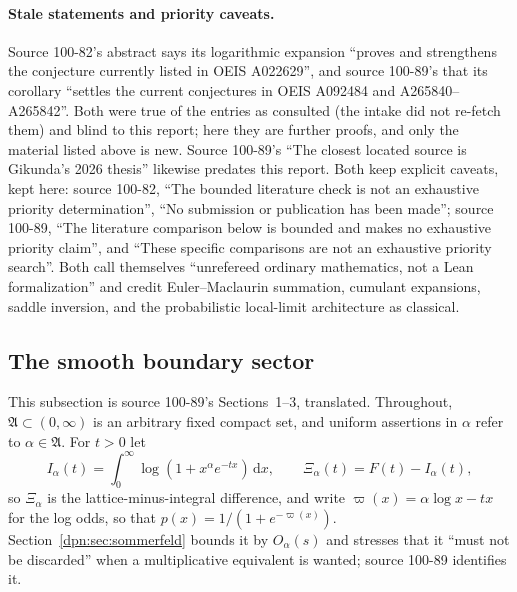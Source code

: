 \documentclass[11pt]{article}
\numberwithin{equation}{section}
\theoremstyle{definition}\newtheorem{definition}[theorem]{Definition}
\theoremstyle{remark}\newtheorem{remark}[theorem]{Remark}
\newcommand{\dd}{\,\mathrm d}\newcommand{\ii}{\mathrm i}
\begin{document}
\paragraph{Stale statements and priority caveats.}
Source 100-82's abstract says its logarithmic expansion ``proves and
strengthens the conjecture currently listed in OEIS A022629'', and source
100-89's that its corollary ``settles the current conjectures in OEIS A092484
and A265840--A265842''.  Both were true of the entries as consulted (the
intake did not re-fetch them) and blind to this report; here they are further
proofs, and only the material listed above is new.  Source 100-89's ``The
closest located source is Gikunda's 2026 thesis'' likewise predates this
report.  Both keep explicit caveats, kept here: source 100-82, ``The bounded
literature check is not an exhaustive priority determination'', ``No
submission or publication has been made''; source 100-89, ``The literature
comparison below is bounded and makes no exhaustive priority claim'', and
``These specific comparisons are not an exhaustive priority search''.  Both
call themselves ``unrefereed ordinary mathematics, not a Lean
formalization'' and credit Euler--Maclaurin summation, cumulant expansions,
saddle inversion, and the probabilistic local-limit architecture as classical.

\subsection{The smooth boundary sector}\label{dpn:rb:sec:boundary}
This subsection is source 100-89's Sections~1--3, translated.  Throughout,
$\mathfrak A\subset(0,\infty)$ is an arbitrary fixed compact set, and uniform
assertions in $\alpha$ refer to $\alpha\in\mathfrak A$.  For $t>0$ let
\begin{equation}\label{dpn:rb:eq:Xi}
 I_\alpha(t)=\int_0^\infty\log(1+x^\alpha e^{-tx})\dd x,\qquad
 \Xi_\alpha(t)=F(t)-I_\alpha(t),
\end{equation}
so $\Xi_\alpha$ is the lattice-minus-integral difference, and write
$\varpi(x)=\alpha\log x-tx$ for the log odds, so that $p(x)=1/(1+e^{-\varpi(x)})$.
Section~\ref{dpn:sec:sommerfeld} bounds it by $O_\alpha(s)$ and stresses that
it ``must not be discarded'' when a multiplicative equivalent is wanted;
source 100-89 identifies it.
\end{document}

